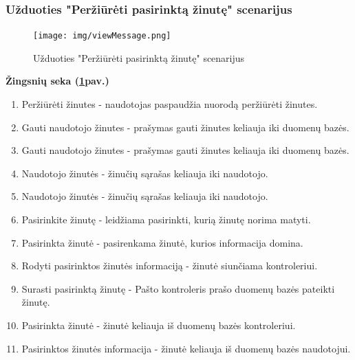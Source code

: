 \documentclass{VUMIFPSkursinis}
\begin{document}
\subsubsection{Užduoties "Peržiūrėti pasirinktą žinutę" scenarijus}
\begin{figure}[H]
	\centering
	\texttt{[image: img/viewMessage.png]}
	\caption{Užduoties "Peržiūrėti pasirinktą žinutę" scenarijus}
	\label{fig:viewMess}
\end{figure}
\textbf{Žingsnių seka (\ref{fig:viewMess}pav.)}\\
\begin{enumerate}
	\item Peržiūrėti žinutes - naudotojas paspaudžia nuorodą peržiūrėti žinutes.
	\item Gauti naudotojo žinutes - prašymas gauti žinutes keliauja iki duomenų bazės.
	\item Gauti naudotojo žinutes - prašymas gauti žinutes keliauja iki duomenų bazės.
	\item Naudotojo žinutės - žinučių sąrašas keliauja iki naudotojo.
	\item Naudotojo žinutės - žinučių sąrašas keliauja iki naudotojo.
	\item Pasirinkite žinutę - leidžiama pasirinkti, kurią žinutę norima matyti.
	\item Pasirinkta žinutė - pasirenkama žinutė, kurios informacija domina.
	\item Rodyti pasirinktos žinutės informaciją - žinutė siunčiama kontroleriui.
	\item Surasti pasirinktą žinutę - Pašto kontroleris prašo duomenų bazės pateikti žinutę.
	\item Pasirinkta žinutė - žinutė keliauja iš duomenų bazės kontroleriui.
	\item Pasirinktos žinutės informacija - žinutė keliauja iš duomenų bazės naudotojui.
\end{enumerate}
\end{document}
